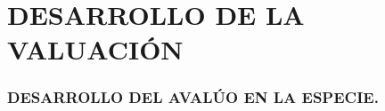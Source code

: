 %


\chapter{DESARROLLO DE LA VALUACI\'ON}\label{cap:5}
\thispagestyle{fancy}

\setcounter{section}{11}

\subsection{DESARROLLO DEL AVAL\'UO EN LA ESPECIE.}\label{sec:k2}


